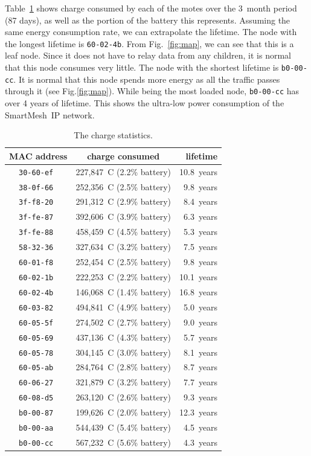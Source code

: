 \documentclass{sig-alternate}
\newcommand{\smip}                {SmartMesh~IP\xspace}
\begin{document}

Table~\ref{tab:stats_charge} shows charge consumed by each of the motes over the 3~month period (87 days), as well as the portion of the battery this represents.
Assuming the same energy consumption rate, we can extrapolate the lifetime.
The node with the longest lifetime is {\tt 60-02-4b}.
From Fig.~\ref{fig:map}, we can see that this is a leaf node.
Since it does not have to relay data from any children, it is normal that this node consumes very little.
The node with the shortest lifetime is {\tt b0-00-cc}.
It is normal that this node spends more energy as all the traffic passes through it (see Fig.\ref{fig:map}).
While being the most loaded node, {\tt b0-00-cc} has over 4 years of lifetime.
This shows the ultra-low power consumption of the \smip network.

\begin{table}
  \begin{tabular}{|c|c|r|}
     \hline
     MAC address    & charge consumed           &   lifetime \\
     \hline
     \tt{30-60-ef}  & 227,847~C (2.2\% battery) & 10.8~years \\
     \tt{38-0f-66}  & 252,356~C (2.5\% battery) &  9.8~years \\
     \tt{3f-f8-20}  & 291,312~C (2.9\% battery) &  8.4~years \\
     \tt{3f-fe-87}  & 392,606~C (3.9\% battery) &  6.3~years \\
     \tt{3f-fe-88}  & 458,459~C (4.5\% battery) &  5.3~years \\
     \tt{58-32-36}  & 327,634~C (3.2\% battery) &  7.5~years \\
     \tt{60-01-f8}  & 252,454~C (2.5\% battery) &  9.8~years \\
     \tt{60-02-1b}  & 222,253~C (2.2\% battery) & 10.1~years \\
     \tt{60-02-4b}  & 146,068~C (1.4\% battery) & 16.8~years \\
     \tt{60-03-82}  & 494,841~C (4.9\% battery) &  5.0~years \\
     \tt{60-05-5f}  & 274,502~C (2.7\% battery) &  9.0~years \\
     \tt{60-05-69}  & 437,136~C (4.3\% battery) &  5.7~years \\
     \tt{60-05-78}  & 304,145~C (3.0\% battery) &  8.1~years \\
     \tt{60-05-ab}  & 284,764~C (2.8\% battery) &  8.7~years \\
     \tt{60-06-27}  & 321,879~C (3.2\% battery) &  7.7~years \\
     \tt{60-08-d5}  & 263,120~C (2.6\% battery) &  9.3~years \\
     \tt{b0-00-87}  & 199,626~C (2.0\% battery) & 12.3~years \\
     \tt{b0-00-aa}  & 544,439~C (5.4\% battery) &  4.5~years \\
     \tt{b0-00-cc}  & 567,232~C (5.6\% battery) &  4.3~years \\
     \hline
  \end{tabular}
  \caption{The charge statistics.}
  \label{tab:stats_charge}
\end{table}
\end{document}
